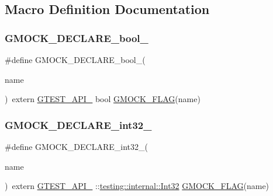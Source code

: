 \subsection{Macro Definition Documentation}
\mbox{\label{gmock-port_8h_a7a0a953221ea8ef5aaa6c644a48af599}} 
\subsubsection{\texorpdfstring{G\+M\+O\+C\+K\+\_\+\+D\+E\+C\+L\+A\+R\+E\+\_\+bool\+\_\+}{GMOCK\_DECLARE\_bool\_}}
{\footnotesize\ttfamily \#define G\+M\+O\+C\+K\+\_\+\+D\+E\+C\+L\+A\+R\+E\+\_\+bool\+\_\+(\begin{DoxyParamCaption}\item[{}]{name }\end{DoxyParamCaption})~extern \hyperlink{gtest-port_8h_aa73be6f0ba4a7456180a94904ce17790}{G\+T\+E\+S\+T\+\_\+\+A\+P\+I\+\_\+} bool \hyperlink{gmock-port_8h_ad7119adfef06be5e7b1551633f5a1436}{G\+M\+O\+C\+K\+\_\+\+F\+L\+AG}(name)}

\mbox{\label{gmock-port_8h_adeb7f0a8d842d1d541615763835af3f9}} 
\subsubsection{\texorpdfstring{G\+M\+O\+C\+K\+\_\+\+D\+E\+C\+L\+A\+R\+E\+\_\+int32\+\_\+}{GMOCK\_DECLARE\_int32\_}}
{\footnotesize\ttfamily \#define G\+M\+O\+C\+K\+\_\+\+D\+E\+C\+L\+A\+R\+E\+\_\+int32\+\_\+(\begin{DoxyParamCaption}\item[{}]{name }\end{DoxyParamCaption})~extern \hyperlink{gtest-port_8h_aa73be6f0ba4a7456180a94904ce17790}{G\+T\+E\+S\+T\+\_\+\+A\+P\+I\+\_\+} \+::\hyperlink{namespacetesting_1_1internal_a8ee38faaf875f133358abaf9bc056cec}{testing\+::internal\+::\+Int32} \hyperlink{gmock-port_8h_ad7119adfef06be5e7b1551633f5a1436}{G\+M\+O\+C\+K\+\_\+\+F\+L\+AG}(name)}

